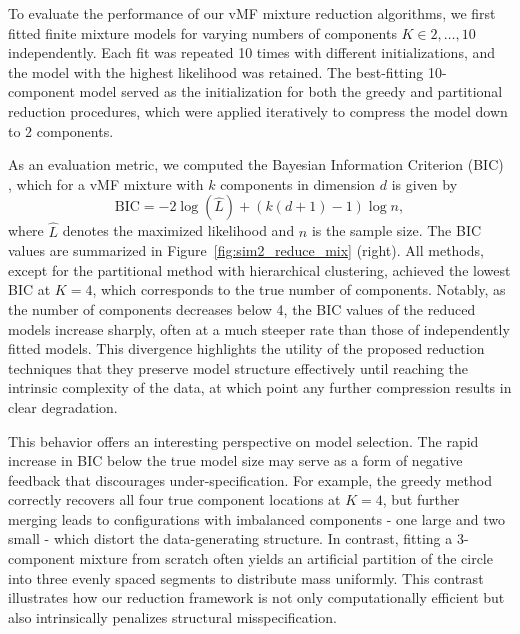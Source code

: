 \documentclass[10pt]{article}
\begin{document}
To evaluate the performance of our vMF mixture reduction algorithms, we first fitted finite mixture models for varying numbers of components $K \in {2, \ldots, 10}$ independently. Each fit was repeated 10 times with different initializations, and the model with the highest likelihood was retained. The best-fitting 10-component model served as the initialization for both the greedy and partitional reduction procedures, which were applied iteratively to compress the model down to 2 components. 

As an evaluation metric, we computed the Bayesian Information Criterion (BIC) \citep{schwarz_1978_EstimatingDimensionModel}, which for a vMF mixture with $k$ components in dimension $d$ is given by 
\begin{equation*}
	\textrm{BIC} = -2 \log (\hat{L}) + (k(d+1)-1)\log n,
\end{equation*}
where $\hat{L}$ denotes the maximized likelihood and $n$ is the sample size. The BIC values are summarized in Figure~\ref{fig:sim2_reduce_mix} (right). All methods, except for the partitional method with hierarchical clustering, achieved the lowest BIC at $K = 4$, which corresponds to the true number of components. Notably, as the number of components decreases below 4, the BIC values of the reduced models increase sharply, often at a much steeper rate than those of independently fitted models. This divergence highlights the utility of the proposed reduction techniques that they preserve model structure effectively until reaching the intrinsic complexity of the data, at which point any further compression results in clear degradation.


This behavior offers an interesting perspective on model selection. The rapid increase in BIC below the true model size may serve as a form of negative feedback that discourages under-specification. For example, the greedy method correctly recovers all four true component locations at $K=4$, but further merging leads to configurations with imbalanced components - one large and two small - which distort the data-generating structure. In contrast, fitting a 3-component mixture from scratch often yields an artificial partition of the circle into three evenly spaced segments to distribute mass uniformly. This contrast illustrates how our reduction framework is not only computationally efficient but also intrinsically penalizes structural misspecification.
\end{document}

